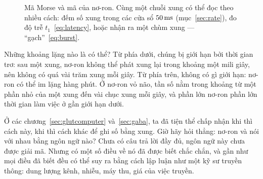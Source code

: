 \begin{figure}[t]
\centering
{}
\caption{Mã Morse và mã của nơ-ron. Cùng một chuỗi xung có thể đọc theo nhiều cách: đếm số xung trong các cửa sổ $50\,\text{ms}$ (mục~\ref{sec:rate}), đo độ trễ $t_1$~\eqref{eq:latency}, hoặc nhận ra một chùm xung --- ``gạch''~\eqref{eq:burst}.}
\label{fig:morse}
\end{figure}

Những khoảng lặng nào là có thể? Từ phía dưới, chúng bị giới hạn bởi thời gian trơ: sau một xung, nơ-ron không thể phát xung lại trong khoảng một mili giây, nên không có quá vài trăm xung mỗi giây. Từ phía trên, không có gì giới hạn: nơ-ron có thể im lặng hàng phút. Ở nơ-ron  vỏ não, tần số nằm trong khoảng từ một phần nhỏ của một xung đến vài chục xung mỗi giây, và phần lớn nơ-ron phần lớn thời gian làm việc ở gần giới hạn dưới.

Ở các chương~\ref{sec:glutcomputer} và~\ref{sec:gaba}, ta đã tiện thể chấp nhận khi thì cách này, khi thì cách khác để ghi số bằng xung. Giờ hãy hỏi thẳng: nơ-ron  và  nói với nhau bằng ngôn ngữ nào? Chưa có câu trả lời đầy đủ, ngôn ngữ này chưa được giải mã. Nhưng có một số điều về nó đã được biết chắc chắn, và gần như mọi điều đã biết đều có thể suy ra bằng cách lập luận như một kỹ sư truyền thông: dung lượng kênh, nhiễu, máy thu, giá của việc truyền.

